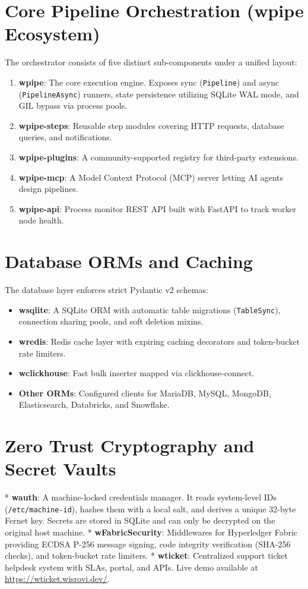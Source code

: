 \documentclass[12pt,a4paper]{report}
\begin{document}
\section{\sffamily Core Pipeline Orchestration (wpipe Ecosystem)}
The orchestrator consists of five distinct sub-components under a unified layout:
\begin{enumerate}
    \item \textbf{wpipe}: The core execution engine. Exposes sync (\texttt{Pipeline}) and async (\texttt{PipelineAsync}) runners, state persistence utilizing SQLite WAL mode, and GIL bypass via process pools.
    \item \textbf{wpipe-steps}: Reusable step modules covering HTTP requests, database queries, and notifications.
    \item \textbf{wpipe-plugins}: A community-supported registry for third-party extensions.
    \item \textbf{wpipe-mcp}: A Model Context Protocol (MCP) server letting AI agents design pipelines.
    \item \textbf{wpipe-api}: Process monitor REST API built with FastAPI to track worker node health.
\end{enumerate}

\section{\sffamily Database ORMs and Caching}
The database layer enforces strict Pydantic v2 schemas:
\begin{itemize}
    \item \textbf{wsqlite}: A SQLite ORM with automatic table migrations (\texttt{TableSync}), connection sharing pools, and soft deletion mixins.
    \item \textbf{wredis}: Redis cache layer with expiring caching decorators and token-bucket rate limiters.
    \item \textbf{wclickhouse}: Fast bulk inserter mapped via clickhouse-connect.
    \item \textbf{Other ORMs}: Configured clients for MariaDB, MySQL, MongoDB, Elasticsearch, Databricks, and Snowflake.
\end{itemize}

\section{\sffamily Zero Trust Cryptography and Secret Vaults}
* \textbf{wauth}: A machine-locked credentials manager. It reads system-level IDs (\texttt{/etc/machine-id}), hashes them with a local salt, and derives a unique 32-byte Fernet key. Secrets are stored in SQLite and can only be decrypted on the original host machine.
* \textbf{wFabricSecurity}: Middlewares for Hyperledger Fabric providing ECDSA P-256 message signing, code integrity verification (SHA-256 checks), and token-bucket rate limiters.
* \textbf{wticket}: Centralized support ticket helpdesk system with SLAs, portal, and APIs. Live demo available at \url{https://wticket.wisrovi.dev/}.
\end{document}
